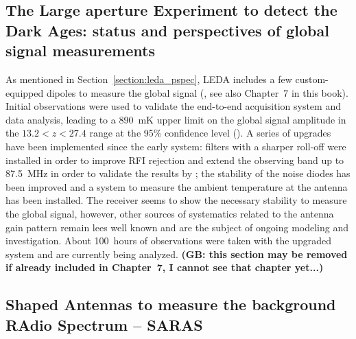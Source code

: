 \subsection{The Large aperture Experiment to detect the Dark Ages: status and perspectives of global signal measurements}
\label{leda_global}
As mentioned in Section~\ref{section:leda_pspec}, LEDA includes a few custom-equipped dipoles to measure the global signal (\cite{price18}, see also Chapter~7 in this book). Initial observations were used to validate the end-to-end acquisition system and data analysis, leading to a 890~mK upper limit on the global signal amplitude in the $13.2 < z < 27.4$ range at the 95\% confidence level (\cite{bernardi16}). A series of upgrades have been implemented since the early system: filters with a sharper roll-off were installed in order to improve RFI rejection and extend the observing band up to 87.5~MHz in order to validate the results by \cite{bowman18}; the stability of the noise diodes has been improved and a system to measure the ambient temperature at the antenna has been installed. The receiver seems to show the necessary stability to measure the global signal, however, other sources of systematics related to the antenna gain pattern remain lees well known and are the subject of ongoing modeling and investigation.
%
About 100~hours of observations were taken with the upgraded system and are currently being analyzed.
%
{\bf (GB: this section may be removed if already included in Chapter~7, I cannot see that chapter yet...)}


\subsection{Shaped Antennas to measure the background RAdio Spectrum -- SARAS}

